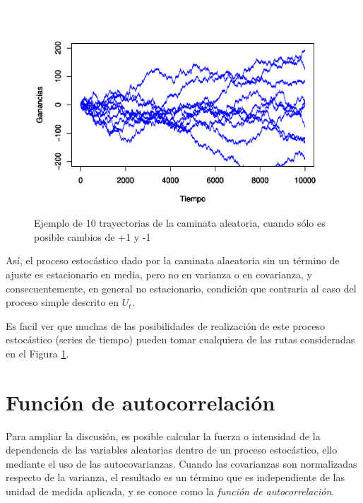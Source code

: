 \documentclass[
]{book}
\begin{document}
\begin{figure}

{\centering \includegraphics{Notas-Series-Tiempo_files/figure-latex/fig31-1} 

}

\caption{Ejemplo de 10 trayectorias de la caminata aleatoria, cuando sólo es posible cambios de +1 y -1}\label{fig:fig31}
\end{figure}

Así, el proceso estocástico dado por la caminata alaeatoria sin un término de ajuste es estacionario en media, pero no en varianza o en covarianza, y consecuentemente, en general no estacionario, condición que contraria al caso del proceso simple descrito en \(U_t\).

Es facil ver que muchas de las posibilidades de realización de este proceso estocástico (series de tiempo) pueden tomar cualquiera de las rutas consideradas en el Figura \ref{fig:fig31}.

\hypertarget{funciuxf3n-de-autocorrelaciuxf3n}{%
\section{Función de autocorrelación}\label{funciuxf3n-de-autocorrelaciuxf3n}}

Para ampliar la discusión, es posible calcular la fuerza o intensidad de la dependencia de las variables aleatorias dentro de un proceso estocástico, ello mediante el uso de las autocovarianzas. Cuando las covarianzas son normalizadas respecto de la varianza, el resultado es un término que es independiente de las unidad de medida aplicada, y se conoce como la \emph{función de autocorrelación}.
\end{document}
